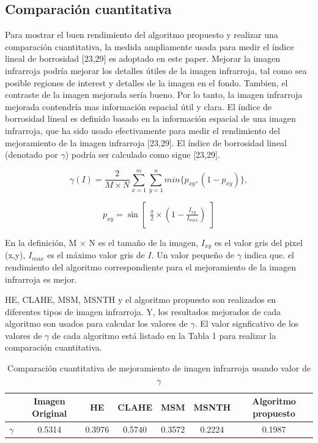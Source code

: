 \documentclass[a4paper, 11 pt, conference]{ieeeconf}      %
\begin{document}
\subsection{Comparaci\'on cuantitativa}

Para mostrar el buen rendimiento del algoritmo propuesto y realizar una comparaci\'on cuantitativa, la medida ampliamente usada para medir el \'indice lineal de borrosidad [23,29] es adoptado en este paper. Mejorar la imagen infrarroja podr\'ia mejorar los detalles \'utiles de la imagen infrarroja, tal como sea posible regiones de interest y detalles de la imagen en el fondo. Tambien, el contraste de la imagen mejorada ser\'ia bueno. Por lo tanto, la imagen infrarroja mejorada contendr\'ia mas informaci\'on espacial \'util y clara. El \'indice de borrosidad lineal es definido basado en la informaci\'on espacial de una imagen infrarroja, que ha sido usado efectivamente para medir el rendimiento del mejoramiento de la imagen infrarroja [23,29]. El \'indice de borrosidad lineal (denotado por $\gamma$) podr\'ia ser calculado como sigue [23,29].

$$
\gamma(I) = \frac{2}{M \times N}\displaystyle\sum_{x=1}^{m}\sum_{y=1}^{n}min\{p_{xy},(1-p_{xy})\},
$$

$$
p_{xy} = \sin 
 \begin{bmatrix}
    \frac{\pi}{2} \times (1 - \frac{I_{xy}}{I_{max}})
 \end{bmatrix}
$$

En la definici\'on, M $\times$ N es el tamaño de la imagen, $I_{xy}$ es el valor gris del pixel (x,y), $I_{max}$ es el m\'aximo valor gris de $I$. Un valor pequeño de $\gamma$ indica que. el rendimiento del algoritmo correspondiente para el mejoramiento de la imagen infrarroja es mejor.

HE, CLAHE, MSM, MSNTH y el algoritmo propuesto son realizados en diferentes tipos de imagen infrarroja. Y, los resultados mejorados de cada algoritmo son usados para calcular los valores de  $\gamma$. El valor signficativo de los valores de $\gamma$ de cada algoritmo est\'a listado en la Tabla 1 para realizar la comparaci\'on cuantitativa.

\begin{table}[h]
\centering
\tiny
\caption{Comparaci\'on cuantitativa de mejoramiento de imagen infrarroja usando valor de $\gamma$}
\label{tabla_1}
\begin{center}
\begin{tabular}{ c c c c c c c }
\hline
& \textbf{Imagen Original} & \textbf{HE} & \textbf{CLAHE} & \textbf{MSM} & \textbf{MSNTH} & \textbf{Algoritmo propuesto}\\
\hline
$\gamma$ & 0.5314 & 0.3976 & 0.5740 & 0.3572 & 0.2224 & 0.1987\\
\hline
\end{tabular}
\end{center}
\end{table}
\normalsize
\end{document}
